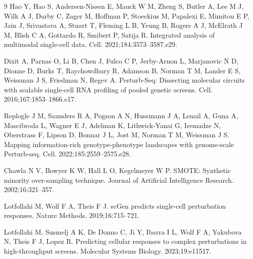 \documentclass{article}
\begin{document}
\begin{thebibliography}{9}
Hao Y, Hao S, Andersen-Nissen E, Mauck W M, Zheng S, Butler A, Lee M J, Wilk A J, Darby C, Zager M, Hoffman P, Stoeckius M, Papalexi E, Mimitou E P, Jain J, Srivastava A, Stuart T, Fleming L B, Yeung B, Rogers A J, McElrath J M, Blish C A, Gottardo R, Smibert P, Satija R. Integrated analysis of multimodal single-cell data. Cell. 2021;184:3573--3587.e29.

Dixit A, Parnas O, Li B, Chen J, Fulco C P, Jerby-Arnon L, Marjanovic N D, Dionne D, Burks T, Raychowdhury R, Adamson B, Norman T M, Lander E S, Weissman J S, Friedman N, Regev A. Perturb-Seq: Dissecting molecular circuits with scalable single-cell RNA profiling of pooled genetic screens. Cell. 2016;167:1853--1866.e17.

Replogle J M, Saunders R A, Pogson A N, Hussmann J A, Lenail A, Guna A, Mascibroda L, Wagner E J, Adelman K, Lithwick-Yanai G, Iremadze N, Oberstrass F, Lipson D, Bonnar J L, Jost M, Norman T M, Weissman J S. Mapping information-rich genotype-phenotype landscapes with genome-scale Perturb-seq. Cell. 2022;185:2559--2575.e28.

Chawla N V, Bowyer K W, Hall L O, Kegelmeyer W P. SMOTE: Synthetic minority over-sampling technique. Journal of Artificial Intelligence Research. 2002;16:321--357.

Lotfollahi M, Wolf F A, Theis F J. scGen predicts single-cell perturbation responses. Nature Methods. 2019;16:715--721.

Lotfollahi M, Susmelj A K, De Donno C, Ji Y, Ibarra I L, Wolf F A, Yakubova N, Theis F J, Lopez R. Predicting cellular responses to complex perturbations in high-throughput screens. Molecular Systems Biology. 2023;19:e11517.
\end{thebibliography}
\end{document}
